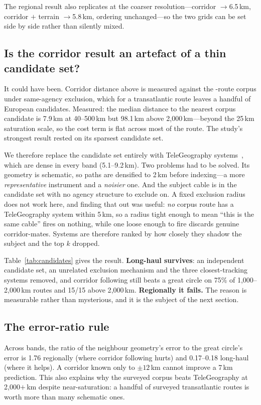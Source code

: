 \documentclass[journal]{IEEEtran}
\begin{document}
The regional result also replicates at the coarser resolution---corridor
\nRegCorridor{}$\rightarrow$6.5\,km, corridor $+$ terrain
\nRegBoth{}$\rightarrow$5.8\,km, ordering unchanged---so the two grids can be
set side by side rather than silently mixed.

\subsection{Is the corridor result an artefact of a thin candidate set?}
\label{sec:candidates}
It could have been. Corridor distance above is measured against the
\nCorpusRoutes-route corpus under same-agency exclusion, which for a
transatlantic route leaves a handful of European candidates. Measured: the
median distance to the nearest corpus candidate is 7.9\,km at 40--500\,km but
98.1\,km above 2{,}000\,km---beyond the 25\,km saturation scale, so the cost
term is flat across most of the route. The study's strongest result rested on
its sparsest candidate set.

We therefore replace the candidate set entirely with \nTgSystems{}
TeleGeography systems~\cite{telegeography}, which are dense in every band
(5.1--9.2\,km). Two problems had to be solved. Its geometry is schematic, so
paths are densified to 2\,km before indexing---a more \emph{representative}
instrument and a \emph{noisier} one. And the subject cable is in the candidate
set with no agency structure to exclude on. A fixed exclusion radius does not
work here, and finding that out was useful: \emph{no} corpus route has a
TeleGeography system within 5\,km, so a radius tight enough to mean ``this is
the same cable'' fires on nothing, while one loose enough to fire discards
genuine corridor-mates. Systems are therefore ranked by how closely they shadow
the subject and the top $k$ dropped.



Table~\ref{tab:candidates} gives the result. \textbf{Long-haul survives}: an
independent candidate set, an unrelated exclusion mechanism and the three
closest-tracking systems removed, and corridor following still beats a great
circle on 75\% of 1{,}000--2{,}000\,km routes and 15/15 above 2{,}000\,km.
\textbf{Regionally it fails.} The reason is measurable rather than mysterious,
and it is the subject of the next section.

\subsection{The error-ratio rule}\label{sec:ratio}
Across bands, the ratio of the neighbour geometry's error to the great circle's
error is 1.76 regionally (where corridor following hurts) and 0.17--0.18
long-haul (where it helps). A corridor known only to $\pm12$\,km cannot improve
a 7\,km prediction. This also explains why the surveyed corpus beats
TeleGeography at 2{,}000$+$\,km despite near-saturation: a handful of surveyed
transatlantic routes is worth more than many schematic ones.
\end{document}
